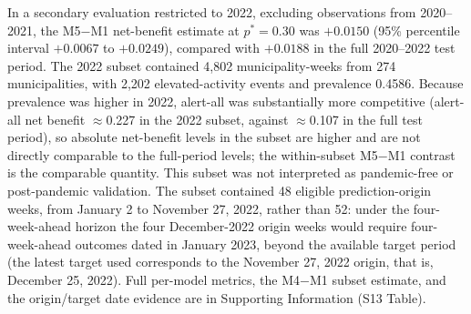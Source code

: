 \documentclass[11pt,a4paper]{article}
\begin{document}
In a secondary evaluation restricted to 2022, excluding observations from 2020--2021, the M5$-$M1 net-benefit estimate at $p^*=0.30$ was $+0.0150$ (95\% percentile interval $+0.0067$ to $+0.0249$), compared with $+0.0188$ in the full 2020--2022 test period. The 2022 subset contained 4{,}802 municipality-weeks from 274 municipalities, with 2{,}202 elevated-activity events and prevalence 0.4586. Because prevalence was higher in 2022, alert-all was substantially more competitive (alert-all net benefit $\approx$0.227 in the 2022 subset, against $\approx$0.107 in the full test period), so absolute net-benefit levels in the subset are higher and are not directly comparable to the full-period levels; the within-subset M5$-$M1 contrast is the comparable quantity. This subset was not interpreted as pandemic-free or post-pandemic validation. The subset contained 48 eligible prediction-origin weeks, from January 2 to November 27, 2022, rather than 52: under the four-week-ahead horizon the four December-2022 origin weeks would require four-week-ahead outcomes dated in January 2023, beyond the available target period (the latest target used corresponds to the November 27, 2022 origin, that is, December 25, 2022). Full per-model metrics, the M4$-$M1 subset estimate, and the origin/target date evidence are in Supporting Information (S13 Table).
\end{document}
